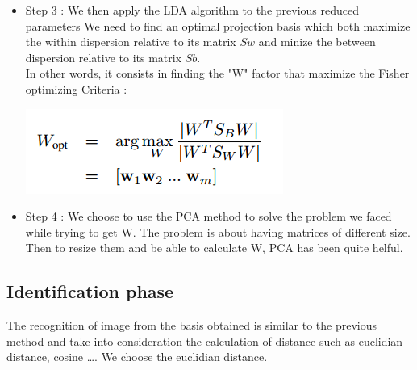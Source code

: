 \begin{itemize}
\item Step 3 :  We then apply the LDA algorithm to the previous reduced parameters
We need to find an optimal projection basis which both maximize the within dispersion relative to its matrix $Sw$ and minize the between dispersion relative to its matrix $Sb$.
\\
In other words, it consists in finding the "W" factor that maximize the Fisher optimizing Criteria :

\begin{center}
\includegraphics[scale=0.75]{critere_opt_fisher}%
\end {center}

\item Step 4 : We choose to use the PCA method to solve the problem we faced while trying to get W. The problem is about having matrices of different size. Then to resize them and be able to calculate W, PCA has been quite helful.



 
\end{itemize} 
\subsection{Identification phase}
The recognition of image from the basis obtained is similar to the previous method and take into consideration the calculation of distance such as euclidian distance, cosine \dots. We choose the euclidian distance.